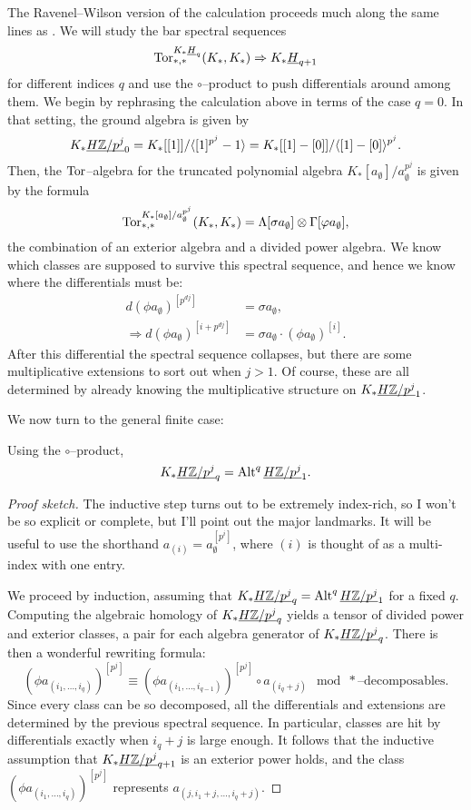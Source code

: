 The Ravenel--Wilson version of the calculation proceeds much along the same lines as .  We will study the bar spectral sequences \[\operatorname{Tor}^{K_* \underline{\smash{H}}_{q}}_{*, *}(K_*, K_*) \Rightarrow K_* \underline{\smash{H}}_{q+1}\] for different indices $q$ and use the $\circ$--product to push differentials around among them.  We begin by rephrasing the calculation above in terms of the case $q = 0$.  In that setting, the ground algebra is given by \[K_* \underline{\smash{H\mathbb Z/p^j}}_{0} = K_*[[1]] / \langle[1]^{p^j} - 1\rangle = K_*[[1] - [0]] / \langle[1] - [0]\rangle^{p^j}.\]  Then, the $\operatorname{Tor}$--algebra for the truncated polynomial algebra $K_*[a_\emptyset] / a_\emptyset^{p^j}$ is given by the formula \[\operatorname{Tor}^{K_*[a_\emptyset] / a_\emptyset^{p^j}}_{*, *}(K_*, K_*) = \Lambda[\sigma a_\emptyset] \otimes \Gamma[\varphi a_\emptyset],\] the combination of an exterior algebra and a divided power algebra.  We know which classes are supposed to survive this spectral sequence, and hence we know where the differentials must be:
\begin{align*}
d(\phi a_\emptyset)^{[p^{dj}]} & = \sigma a_\emptyset, \\
\Rightarrow d(\phi a_\emptyset)^{[i + p^{dj}]} & = \sigma a_\emptyset \cdot (\phi a_\emptyset)^{[i]}.
\end{align*}
After this differential the spectral sequence collapses, but there are some multiplicative extensions to sort out when $j > 1$.  Of course, these are all determined by already knowing the multiplicative structure on $K_* \underline{\smash{H\mathbb Z/p^j}}_{1}$.

We now turn to the general finite case:
\begin{theorem}
Using the $\circ$--product, \[K_* \underline{\smash{H\mathbb Z/p^j}}_{q} = \operatorname{Alt}^q \underline{\smash{H\mathbb Z/p^j}}_{1}.\]
\end{theorem}
\begin{proof}[Proof sketch]
The inductive step turns out to be extremely index-rich, so I won't be so explicit or complete, but I'll point out the major landmarks.  It will be useful to use the shorthand $a_{(i)} = a_\emptyset^{[p^i]}$, where $(i)$ is thought of as a multi-index with one entry.

We proceed by induction, assuming that $K_* \underline{\smash{H\mathbb Z/p^j}}_{q} = \operatorname{Alt}^q \underline{\smash{H\mathbb Z/p^j}}_{1}$ for a fixed $q$.  Computing the algebraic homology of $K_* \underline{\smash{H\mathbb Z/p^j}}_{q}$ yields a tensor of divided power and exterior classes, a pair for each algebra generator of $K_* \underline{\smash{H\mathbb Z/p^j}}_{q}$.  There is then a wonderful rewriting formula: \[(\phi a_{(i_1, \ldots, i_q)})^{[p^j]} \equiv  (\phi a_{(i_1, \ldots, i_{q-1})})^{[p^j]} \circ a_{(i_q + j)} \mod *\text{--decomposables}.\]  Since every class can be so decomposed, all the differentials and extensions are determined by the previous spectral sequence.  In particular, classes are hit by differentials exactly when $i_q + j$ is large enough.  It follows that the inductive assumption that $K_* \underline{\smash{H\mathbb Z/p^j}}_{q+1}$ is an exterior power holds, and the class $(\phi a_{(i_1, \ldots, i_q)})^{[p^j]}$ represents $a_{(j, i_1 + j, \ldots, i_q + j)}$.
\end{proof}


